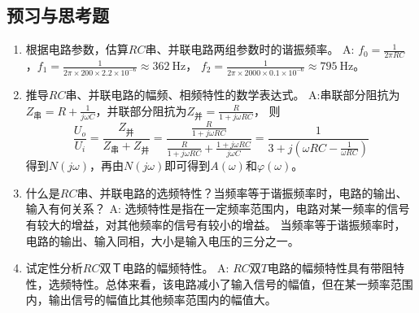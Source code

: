 \documentclass[UTF8]{article}
\begin{document}
        \subsection{预习与思考题}
            \begin{enumerate}[label=\textbf{\arabic*}.]
                \item 根据电路参数，估算$RC$串、并联电路两组参数时的谐振频率。\newline
                A: $f_0 = \frac{1}{2\pi RC}$，$f_1 = \frac{1}{2\pi \times 200 \times 2.2 \times 10^{-6}} \approx \SI{362}{\hertz}$，
                $f_2 = \frac{1}{2\pi \times 2000 \times 0.1 \times 10^{-6}} \approx \SI{795}{\hertz}$。
                \item 推导$RC$串、并联电路的幅频、相频特性的数学表达式。\newline
                A:串联部分阻抗为$Z_{\text{串}} = R + \frac{1}{j\omega C}$，并联部分阻抗为$Z_{\text{并}} = \frac{R}{1+j\omega RC}$，
                则
                $$
                \frac{U_o}{U_i} = \frac{Z_{\text{并}}}{Z_{\text{串}} + Z_{\text{并}}} = 
                \frac{\frac{R}{1+j\omega RC}}{\frac{R}{1+j\omega RC}+\frac{1+j\omega RC}{j\omega C}} 
                = \frac{1}{3+j\left( \omega RC - \frac{1}{\omega RC}\right)}
                $$
                得到$N(j\omega)$，再由$N(j\omega)$即可得到$A(\omega)$和$\varphi(\omega)$。
                \item 什么是$RC$串、并联电路的选频特性？当频率等于谐振频率时，电路的输出、输入有何关系？\newline
                A: 选频特性是指在一定频率范围内，电路对某一频率的信号有较大的增益，对其他频率的信号有较小的增益。
                当频率等于谐振频率时，电路的输出、输入同相，大小是输入电压的三分之一。
                \item 试定性分析$RC$双Ｔ电路的幅频特性。\newline 
                A: $RC$双$T$电路的幅频特性具有带阻特性，选频特性。总体来看，该电路减小了输入信号的幅值，但在某一频率范围内，输出信号的幅值比其他频率范围内的幅值大。    
            \end{enumerate}
\end{document}
